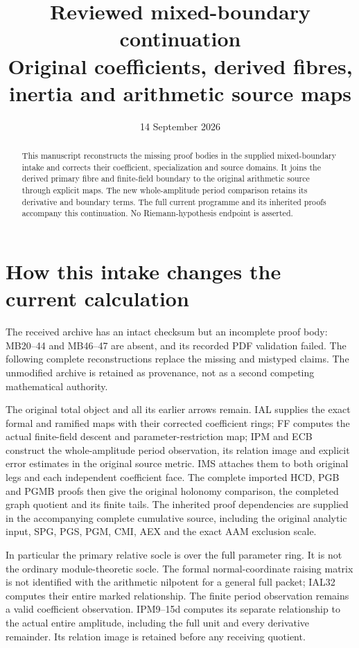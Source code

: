 \documentclass[11pt,a4paper]{article}
\title{Reviewed mixed-boundary continuation\\\large Original coefficients, derived fibres, inertia and arithmetic source maps}
\author{}
\date{14 September 2026}
\theoremstyle{definition}
\begin{document}
\maketitle
\begin{abstract}
This manuscript reconstructs the missing proof bodies in the supplied
mixed-boundary intake and corrects their coefficient, specialization and
source domains. It joins the derived primary fibre and finite-field
boundary to the original arithmetic source through explicit maps. The
new whole-amplitude period comparison retains its derivative and boundary
terms. The full current programme and its inherited proofs accompany
this continuation. No Riemann-hypothesis endpoint is asserted.
\end{abstract}
\tableofcontents
\clearpage
\section{How this intake changes the current calculation}
The received archive has an intact checksum but an incomplete proof body:
MB20--44 and MB46--47 are absent, and its recorded PDF validation failed.
The following complete reconstructions replace the missing and mistyped
claims. The unmodified archive is retained as provenance, not as a
second competing mathematical authority.

The original total object and all its earlier arrows remain. IAL supplies
the exact formal and ramified maps with their corrected coefficient rings;
FF computes the actual finite-field descent and parameter-restriction
map; IPM and ECB construct the whole-amplitude period observation, its
relation image and explicit error estimates in the original source metric.
IMS attaches them to both original legs and each independent coefficient
face. The complete imported HCD, PGB and PGMB proofs then give the original
holonomy comparison, the completed graph quotient and its finite tails.
The inherited proof dependencies are supplied in the accompanying complete
cumulative source, including the original analytic input, SPG, PGS, PGM,
CMI, AEX and the exact AAM exclusion scale.

In particular the primary relative socle is over the full parameter ring.
It is not the ordinary module-theoretic socle. The formal normal-coordinate
raising matrix is not identified with the arithmetic nilpotent for a
general full packet; IAL32 computes their entire marked relationship.
The finite period observation remains a valid coefficient observation.
IPM9--15d computes its separate relationship to the actual entire amplitude,
including the full unit and every derivative remainder. Its relation image
is retained before any receiving quotient.
\end{document}
